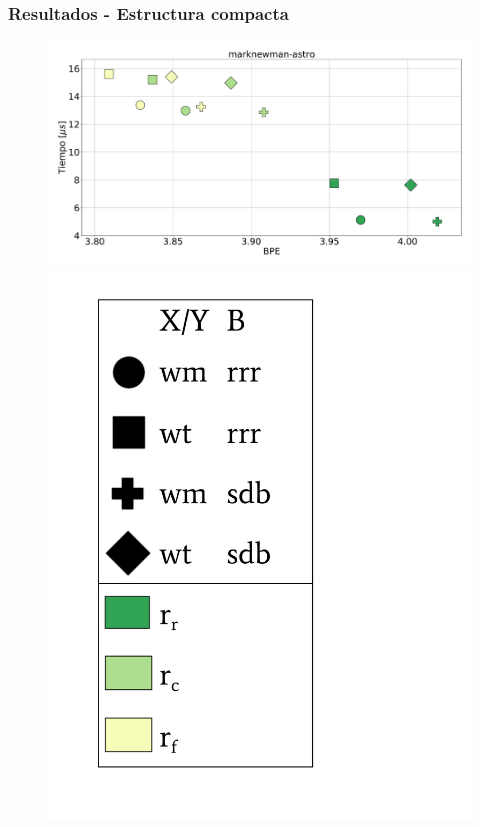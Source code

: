 \begin{frame}
\frametitle{Resultados - Estructura compacta}

\begin{figure}
	\centering
	
    	\begin{minipage}{1\textwidth}
    		\centering
    		\begin{minipage}{0.8\textwidth}
    			\centering
    			\includegraphics[width=1\linewidth]{../img/sdsl/aleatorioBig/marknewman-astro.pdf}
    		\end{minipage}
    		\begin{minipage}{0.15\textwidth}
    			\centering
    			\includegraphics[scale=.15, clip, trim=70 0 0 0]{../img/sdsl/label.pdf}
    		\end{minipage}	
    	\end{minipage}


\end{figure}
\end{frame}

